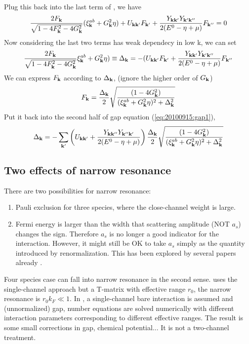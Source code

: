 \documentclass{article}
\begin{document}
Plug this back into the last term of , we have 
\begin{equation}
\frac{2F_{\mathbf{k}}}{\sqrt{1-4 F_{\mathbf{k}}^2-4 G_{\mathbf{k}}^2}} (\xi^{ab}_{\mathbf{k}}+  G_{\mathbf{k}}^2\eta)+U_{\mathbf{k}\mathbf{k}'}F_{\mathbf{k}'}+\frac{Y_{\mathbf{k}\mathbf{k}'}Y_{\mathbf{k}'\mathbf{k}''}}{2(E^{0}-\eta+\mu)}F_{\mathbf{k}''}=0
\end{equation}
Now considering the last two terms has weak dependecy in low k, we can set 
\begin{equation}\label{eq:20100915:gap1}
\frac{2F_{\mathbf{k}}}{\sqrt{1-4 F_{\mathbf{k}}^2-4 G_{\mathbf{k}}^2}} \xi^{ab}_{\mathbf{k}}+  G_{\mathbf{k}}^2\eta)\equiv\Delta_{\mathbf{k}}=-(U_{\mathbf{k}\mathbf{k}'}F_{\mathbf{k}'}+\frac{Y_{\mathbf{k}\mathbf{k}'}Y_{\mathbf{k}'\mathbf{k}''}}{2(E^{0}-\eta+\mu)}F_{\mathbf{k}''}
\end{equation}
We can express $F_{\mathbf{k}}$ according to $\Delta_{\mathbf{k}}$,  (ignore the higher order of $G_{\mathbf{k}}$)
\begin{equation}
F_{\mathbf{k}}=\frac{\Delta_{\mathbf{k}}}2\sqrt{\frac{(1-4G_{\mathbf{k}}^{2})}{(\xi^{ab}_{\mathbf{k}}+  G_{\mathbf{k}}^2\eta)^{2}+\Delta_{\mathbf{k}}^{2}}}
\end{equation}
Put it back into the second half of gap equation (\ref{eq:20100915:gap1}), 
\begin{equation}\label{eq:20100915:onechannel}
\Delta_{\mathbf{k}}=-\sum_{\mathbf{k}'}\left(U_{\mathbf{k}\mathbf{k}'}+\frac{Y_{\mathbf{k}\mathbf{k}''}Y_{\mathbf{k}''\mathbf{k}'}}{2(E^{0}-\eta+\mu)}\right)\frac{\Delta_{\mathbf{k}}}2\sqrt{\frac{(1-4G_{\mathbf{k}}^{2})}{(\xi^{ab}_{\mathbf{k}}+  G_{\mathbf{k}}^2\eta)^{2}+\Delta_{\mathbf{k}}^{2}}}
\end{equation}


\subsection{Two effects of narrow resonance}
There are two possibilities for narrow resonance:  
\begin{enumerate}
\item Pauli exclusion for three species, where the close-channel weight is large.  
\item Fermi energy is larger than the width that scattering amplitude (NOT $a_{s}$) changes the sign.  Therefore $a_{s}$ is no longer a good indicator for the interaction.  However, it might still be OK to take $a_{s}$ simply as the quantity introduced by renormalization.   This has been explored by several papers already \cite{NarrowJensen1,NarrowJensen,GurarieNarrow}.  
\end{enumerate}
Four species case can fall into narrow resonance in  the second sense.  \cite{NarrowJensen1,NarrowJensen} uses the single-channel approach but a T-matrix with effective range $r_{0}$, the narrow resonance is $r_{0}k_{F}\ll1$.  In \cite{NarrowJensen}, a single-channel bare interaction is assumed and (unnormalized) gap, number equations  are  solved numerically with different interaction parameters corresponding to different effective ranges. The result is some small corrections in gap, chemical potential...   It is not a two-channel treatment.  
\end{document}
